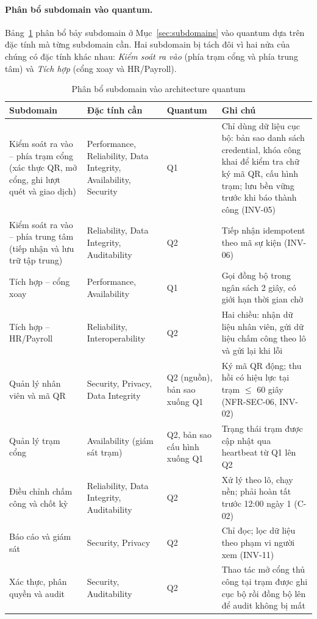 \paragraph{Phân bổ subdomain vào quantum.} Bảng~\ref{tab:subdomain-quantum} phân bổ bảy subdomain ở Mục~\ref{sec:subdomains} vào quantum dựa trên đặc tính mà từng subdomain cần. Hai subdomain bị tách đôi vì hai nửa của chúng có đặc tính khác nhau: \textit{Kiểm soát ra vào} (phía trạm cổng và phía trung tâm) và \textit{Tích hợp} (cổng xoay và HR/Payroll).

\begin{table}[H]
\centering
\caption{Phân bổ subdomain vào architecture quantum}\label{tab:subdomain-quantum}
\small
\renewcommand{\arraystretch}{1.3}
\begin{tabularx}{\textwidth}{|>{\raggedright\arraybackslash}p{3.7cm}|>{\raggedright\arraybackslash}p{3.4cm}|>{\centering\arraybackslash}p{1.6cm}|>{\raggedright\arraybackslash}X|}
\hline
\textbf{Subdomain} & \textbf{Đặc tính cần} & \textbf{Quantum} & \textbf{Ghi chú} \\
\hline
Kiểm soát ra vào -- phía trạm cổng (xác thực QR, mở cổng, ghi lượt quét và giao dịch) & Performance, Reliability, Data Integrity, Availability, Security & Q1 & Chỉ dùng dữ liệu cục bộ: bản sao danh sách credential, khóa công khai để kiểm tra chữ ký mã QR, cấu hình trạm; lưu bền vững trước khi báo thành công (INV-05) \\
\hline
Kiểm soát ra vào -- phía trung tâm (tiếp nhận và lưu trữ tập trung) & Reliability, Data Integrity, Auditability & Q2 & Tiếp nhận idempotent theo mã sự kiện (INV-06) \\
\hline
Tích hợp -- cổng xoay & Performance, Availability & Q1 & Gọi đồng bộ trong ngân sách 2 giây, có giới hạn thời gian chờ \\
\hline
Tích hợp -- HR/Payroll & Reliability, Interoperability & Q2 & Hai chiều: nhận dữ liệu nhân viên, gửi dữ liệu chấm công theo lô và gửi lại khi lỗi \\
\hline
Quản lý nhân viên và mã QR & Security, Privacy, Data Integrity & Q2 (nguồn), bản sao xuống Q1 & Ký mã QR động; thu hồi có hiệu lực tại trạm $\le$ 60 giây (NFR-SEC-06, INV-02) \\
\hline
Quản lý trạm cổng & Availability (giám sát trạm) & Q2, bản sao cấu hình xuống Q1 & Trạng thái trạm được cập nhật qua heartbeat từ Q1 lên Q2 \\
\hline
Điều chỉnh chấm công và chốt kỳ & Reliability, Data Integrity, Auditability & Q2 & Xử lý theo lô, chạy nền; phải hoàn tất trước 12:00 ngày 1 (C-02) \\
\hline
Báo cáo và giám sát & Security, Privacy & Q2 & Chỉ đọc; lọc dữ liệu theo phạm vi người xem (INV-11) \\
\hline
Xác thực, phân quyền và audit & Security, Auditability & Q2 & Thao tác mở cổng thủ công tại trạm được ghi cục bộ rồi đồng bộ lên để audit không bị mất \\
\hline
\end{tabularx}
\end{table}

